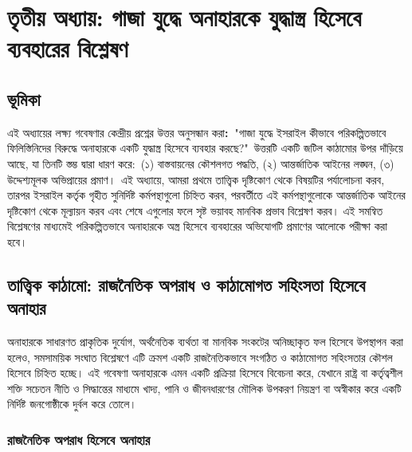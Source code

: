 \section{\texorpdfstring{তৃতীয় অধ্যায়: গাজা যুদ্ধে অনাহারকে যুদ্ধাস্ত্র হিসেবে ব্যবহারের বিশ্লেষণ}{গাজা যুদ্ধে অনাহারকে যুদ্ধাস্ত্র হিসেবে ব্যবহারের বিশ্লেষণ}}\label{ux997ux99c-ux9afux9a6ux9a7-ux985ux9a8ux9b9ux9b0ux995-ux9afux9a6ux9a7ux9b8ux9a4ux9b0-ux9b9ux9b8ux9ac-ux9acux9afux9acux9b9ux9b0ux9b0-ux9acux9b6ux9b2ux9b7ux9a3}

\subsection{ভূমিকা}\label{ux9adux9aeux995-1}

এই অধ্যায়ের লক্ষ্য গবেষণার কেন্দ্রীয় প্রশ্নের উত্তর অনুসন্ধান করা\textbf{:~}"গাজা
যুদ্ধে ইসরাইল কীভাবে পরিকল্পিতভাবে ফিলিস্তিনিদের বিরুদ্ধে অনাহারকে একটি
যুদ্ধাস্ত্র হিসেবে ব্যবহার করছে?"~উত্তরটি একটি জটিল কাঠামোর উপর দাঁড়িয়ে আছে, যা
তিনটি স্তম্ভ দ্বারা ধারণ করে:~(১) বাস্তবায়নের কৌশলগত পদ্ধতি, (২) আন্তর্জাতিক
আইনের লঙ্ঘন, (৩) উদ্দেশ্যমূলক অভিপ্রায়ের প্রমাণ।~এই অধ্যায়ে, আমরা প্রথমে তাত্ত্বিক
দৃষ্টিকোণ থেকে বিষয়টির পর্যালোচনা করব, তারপর ইসরাইল কর্তৃক গৃহীত সুনির্দিষ্ট
কর্মপন্থাগুলো চিহ্নিত করব, পরবর্তীতে এই কর্মপন্থাগুলোকে আন্তর্জাতিক আইনের দৃষ্টিকোণ
থেকে মূল্যায়ন করব এবং শেষে এগুলোর ফলে সৃষ্ট ভয়াবহ মানবিক প্রভাব বিশ্লেষণ করব।
এই সমন্বিত বিশ্লেষণের মাধ্যমেই পরিকল্পিতভাবে অনাহারকে অস্ত্র হিসেবে ব্যবহারের
অভিযোগটি প্রমাণের আলোকে পরীক্ষা করা হবে।

\subsection{তাত্ত্বিক কাঠামো: রাজনৈতিক অপরাধ ও কাঠামোগত সহিংসতা হিসেবে
অনাহার}\label{ux9a4ux9a4ux9a4ux9acux995-ux995ux9a0ux9ae-ux9b0ux99cux9a8ux9a4ux995-ux985ux9aaux9b0ux9a7-ux993-ux995ux9a0ux9aeux997ux9a4-ux9b8ux9b9ux9b8ux9a4-ux9b9ux9b8ux9ac-ux985ux9a8ux9b9ux9b0}

অনাহারকে সাধারণত প্রাকৃতিক দুর্যোগ, অর্থনৈতিক ব্যর্থতা বা মানবিক সংকটের
অনিচ্ছাকৃত ফল হিসেবে উপস্থাপন করা হলেও, সমসাময়িক সংঘাত বিশ্লেষণে এটি ক্রমশ
একটি রাজনৈতিকভাবে সংগঠিত ও কাঠামোগত সহিংসতার কৌশল হিসেবে চিহ্নিত হচ্ছে। এই
গবেষণা অনাহারকে এমন একটি প্রক্রিয়া হিসেবে বিবেচনা করে, যেখানে রাষ্ট্র বা
কর্তৃত্বশীল শক্তি সচেতন নীতি ও সিদ্ধান্তের মাধ্যমে খাদ্য, পানি ও জীবনধারণের
মৌলিক উপকরণ নিয়ন্ত্রণ বা অস্বীকার করে একটি নির্দিষ্ট জনগোষ্ঠীকে দুর্বল করে তোলে।

\subsubsection{রাজনৈতিক অপরাধ হিসেবে
অনাহার}\label{ux9b0ux99cux9a8ux9a4ux995-ux985ux9aaux9b0ux9a7-ux9b9ux9b8ux9ac-ux985ux9a8ux9b9ux9b0}

